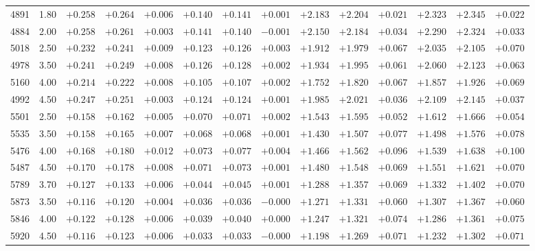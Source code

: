 \documentclass[]{aa}
\begin{document}
\begin{appendix}
\begin{table*}
\begin{center}
\begin{tabular}{llllllllllllll}
4891  &1.80 & $+0.258$ & $+0.264$ & $+0.006$ & $+0.140$ & $+0.141$ & $+0.001$ & $+2.183$ & $+2.204$ & $+0.021$ & $+2.323$ & $+2.345$ & $+0.022$ \\
4884  &2.00 & $+0.258$ & $+0.261$ & $+0.003$ & $+0.141$ & $+0.140$ & $-0.001$ & $+2.150$ & $+2.184$ & $+0.034$ & $+2.290$ & $+2.324$ & $+0.033$ \\
5018  &2.50 & $+0.232$ & $+0.241$ & $+0.009$ & $+0.123$ & $+0.126$ & $+0.003$ & $+1.912$ & $+1.979$ & $+0.067$ & $+2.035$ & $+2.105$ & $+0.070$ \\
4978  &3.50 & $+0.241$ & $+0.249$ & $+0.008$ & $+0.126$ & $+0.128$ & $+0.002$ & $+1.934$ & $+1.995$ & $+0.061$ & $+2.060$ & $+2.123$ & $+0.063$ \\
5160  &4.00 & $+0.214$ & $+0.222$ & $+0.008$ & $+0.105$ & $+0.107$ & $+0.002$ & $+1.752$ & $+1.820$ & $+0.067$ & $+1.857$ & $+1.926$ & $+0.069$ \\
4992  &4.50 & $+0.247$ & $+0.251$ & $+0.003$ & $+0.124$ & $+0.124$ & $+0.001$ & $+1.985$ & $+2.021$ & $+0.036$ & $+2.109$ & $+2.145$ & $+0.037$ \\
5501  &2.50 & $+0.158$ & $+0.162$ & $+0.005$ & $+0.070$ & $+0.071$ & $+0.002$ & $+1.543$ & $+1.595$ & $+0.052$ & $+1.612$ & $+1.666$ & $+0.054$ \\
5535  &3.50 & $+0.158$ & $+0.165$ & $+0.007$ & $+0.068$ & $+0.068$ & $+0.001$ & $+1.430$ & $+1.507$ & $+0.077$ & $+1.498$ & $+1.576$ & $+0.078$ \\
5476  &4.00 & $+0.168$ & $+0.180$ & $+0.012$ & $+0.073$ & $+0.077$ & $+0.004$ & $+1.466$ & $+1.562$ & $+0.096$ & $+1.539$ & $+1.638$ & $+0.100$ \\
5487  &4.50 & $+0.170$ & $+0.178$ & $+0.008$ & $+0.071$ & $+0.073$ & $+0.001$ & $+1.480$ & $+1.548$ & $+0.069$ & $+1.551$ & $+1.621$ & $+0.070$ \\
5789  &3.70 & $+0.127$ & $+0.133$ & $+0.006$ & $+0.044$ & $+0.045$ & $+0.001$ & $+1.288$ & $+1.357$ & $+0.069$ & $+1.332$ & $+1.402$ & $+0.070$ \\
5873  &3.50 & $+0.116$ & $+0.120$ & $+0.004$ & $+0.036$ & $+0.036$ & $-0.000$ & $+1.271$ & $+1.331$ & $+0.060$ & $+1.307$ & $+1.367$ & $+0.060$ \\
5846  &4.00 & $+0.122$ & $+0.128$ & $+0.006$ & $+0.039$ & $+0.040$ & $+0.000$ & $+1.247$ & $+1.321$ & $+0.074$ & $+1.286$ & $+1.361$ & $+0.075$ \\
5920  &4.50 & $+0.116$ & $+0.123$ & $+0.006$ & $+0.033$ & $+0.033$ & $-0.000$ & $+1.198$ & $+1.269$ & $+0.071$ & $+1.232$ & $+1.302$ & $+0.071$ \\

\end{tabular}
\end{center}
\end{table*}
\end{appendix}
\end{document}
